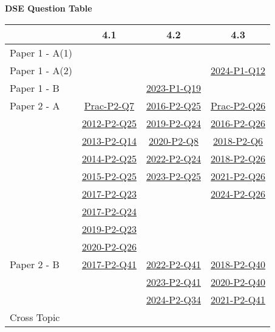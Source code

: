 \documentclass[12pt, a4paper]{article}
\begin{document}
\begin{absolutelynopagebreak}
\begin{center}
\textbf{DSE Question Table}
\end{center}
\begin{center}
\begin{tabular}{|l|c|c|c|}
\hline
        & 4.1 & 4.2 & 4.3 \\\hline
\hline
Paper 1 - A(1)&  &  &  \\
\hline
Paper 1 - A(2)&  &  & \hyperref[DSE2024-CoreP1-Q12]{2024-P1-Q12} \\
\hline
Paper 1 - B&  & \hyperref[DSE2023-CoreP1-Q19]{2023-P1-Q19} &  \\
\hline
\hline
Paper 2 - A& \hyperref[DSE2012P-CoreP2-Q07]{Prac-P2-Q7} & \hyperref[DSE2016-CoreP2-Q25]{2016-P2-Q25} & \hyperref[DSE2012P-CoreP2-Q26]{Prac-P2-Q26} \\
& \hyperref[DSE2012-CoreP2-Q25]{2012-P2-Q25} & \hyperref[DSE2019-CoreP2-Q24]{2019-P2-Q24} & \hyperref[DSE2016-CoreP2-Q26]{2016-P2-Q26} \\
& \hyperref[DSE2013-CoreP2-Q14]{2013-P2-Q14} & \hyperref[DSE2020-CoreP2-Q08]{2020-P2-Q8} & \hyperref[DSE2018-CoreP2-Q06]{2018-P2-Q6} \\
& \hyperref[DSE2014-CoreP2-Q25]{2014-P2-Q25} & \hyperref[DSE2022-CoreP2-Q24]{2022-P2-Q24} & \hyperref[DSE2018-CoreP2-Q26]{2018-P2-Q26} \\
& \hyperref[DSE2015-CoreP2-Q25]{2015-P2-Q25} & \hyperref[DSE2023-CoreP2-Q25]{2023-P2-Q25} & \hyperref[DSE2021-CoreP2-Q26]{2021-P2-Q26} \\
& \hyperref[DSE2017-CoreP2-Q23]{2017-P2-Q23} &  & \hyperref[DSE2024-CoreP2-Q26]{2024-P2-Q26} \\
& \hyperref[DSE2017-CoreP2-Q24]{2017-P2-Q24} &  &  \\
& \hyperref[DSE2019-CoreP2-Q23]{2019-P2-Q23} &  &  \\
& \hyperref[DSE2020-CoreP2-Q26]{2020-P2-Q26} &  &  \\
\hline
Paper 2 - B& \hyperref[DSE2017-CoreP2-Q41]{2017-P2-Q41} & \hyperref[DSE2022-CoreP2-Q41]{2022-P2-Q41} & \hyperref[DSE2018-CoreP2-Q40]{2018-P2-Q40} \\
&  & \hyperref[DSE2023-CoreP2-Q41]{2023-P2-Q41} & \hyperref[DSE2020-CoreP2-Q40]{2020-P2-Q40} \\
&  & \hyperref[DSE2024-CoreP2-Q34]{2024-P2-Q34} & \hyperref[DSE2021-CoreP2-Q41]{2021-P2-Q41} \\
\hline
\hline
Cross Topic&  &  &  \\
\hline
\end{tabular}
\end{center}
\end{absolutelynopagebreak}
\end{document}
